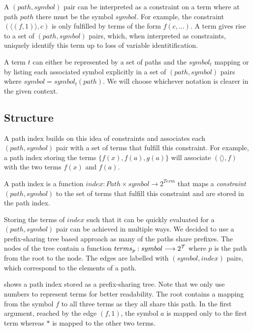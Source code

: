 A $(path, symbol)$ pair can be interpreted as a constraint on a term where at path $path$ there must be the symbol $symbol$. For example, the constraint $(\langle (f,1) \rangle, c)$ is only fulfilled by terms of the form $f(c,\dots)$. A term gives rise to a set of $(path, symbol)$ pairs, which, when interpreted as constraints, uniquely identify this term up to loss of variable identitification.

A term $t$ can either be represented by a set of paths and the $symbol_{t}$ mapping or by listing each associated symbol explicitly in a set of $(path, symbol)$ pairs where $symbol = symbol_{t}(path)$. We will choose whichever notation is clearer in the given context.

\subsection{Structure}
A path index builds on this idea of constraints and associates each $(path, symbol)$ pair with a set of terms that fulfill this constraint. For example, a path index storing the terms $\{f(x), f(a), g(a)\}$ will associate $(\langle \rangle, f)$ with the two terms $f(x)$ and $f(a)$.

\begin{defn}
  A path index is a function $index: Path \times symbol \longrightarrow 2^{Term}$ that maps a \emph{constraint} $(path,symbol)$ to the set of terms that fulfill this constraint and are stored in the path index.
\end{defn}

Storing the terms of $index$ such that it can be quickly evaluated for a $(path, symbol)$ pair can be achieved in multiple ways. We decided to use a prefix-sharing tree based approach as many of the paths share prefixes. The nodes of the tree contain a function $terms_{p}: symbol  \longrightarrow 2^{\mathcal{T}}$ where $p$ is the path from the root to the node. The edges are labelled with $(symbol, index)$ pairs, which correspond to the elements of a path.

 shows a path index stored as a prefix-sharing tree. Note that we only use numbers to represent terms for better readability. The root contains a mapping from the symbol $f$ to all three terms as they all share this path. In the first argument, reached by the edge $(f,1)$, the symbol $a$ is mapped only to the first term whereas $*$ is mapped to the other two terms.


